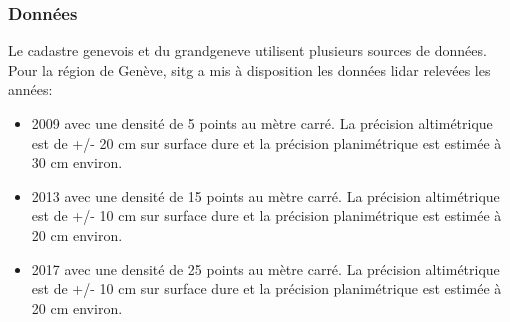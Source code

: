 \subsubsection{Données}
\par{Le cadastre genevois et du \gls{grandgeneve} \cite{desthieux_cadastre_nodate} utilisent plusieurs sources de données. Pour la région de Genève, \acrshort{sitg} a mis à disposition les données \gls{lidar} relevées les années:}
\begin{itemize}
    \item 2009 \cite{sitg_nuages_2009} avec une densité de 5 points au mètre carré. La précision altimétrique est de +/- 20 cm sur surface dure et la précision planimétrique est estimée à 30 cm environ.
    \item 2013 \cite{sitg_nuages_2013} avec une densité de 15 points au mètre carré. La précision altimétrique est de +/- 10 cm sur surface dure et la précision planimétrique est estimée à 20 cm environ.
    \item 2017 \cite{sitg_nuages_2017} avec une densité de 25 points au mètre carré. La précision altimétrique est de +/- 10 cm sur surface dure et la précision planimétrique est estimée à 20 cm environ.
\end{itemize}
